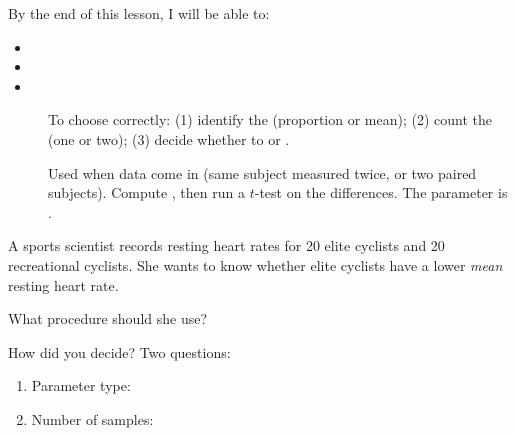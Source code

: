 \documentclass[10pt]{article}
\begin{document}
\namedateperiod

\vspace{0.12in}

\begin{objectivebox}
By the end of this lesson, I will be able to:
\begin{itemize}
  \item \writeline
  \item \writeline
  \item \writeline
\end{itemize}
\end{objectivebox}

\begin{vocabbox}
\begin{description}
  \item[]
        To choose correctly: (1) identify the \blank{4cm} (proportion or mean); (2) count
        the \blank{3.5cm} (one or two); (3) decide whether to \blank{3cm} or \blank{3cm}.
  \item[]
        Used when data come in \blank{4cm} (same subject measured twice, or two paired
        subjects). Compute \blank{3cm}, then run a \blank{5cm} $t$-test on the differences.
        The parameter is \blank{2cm}.
\end{description}
\end{vocabbox}

\begin{hookbox}
A sports scientist records resting heart rates for 20 elite cyclists and 20 recreational
cyclists. She wants to know whether elite cyclists have a lower \emph{mean} resting heart rate.

What procedure should she use? \blank{7cm}

How did you decide? Two questions:
\begin{enumerate}
  \item Parameter type: \blank{8cm}
  \item Number of samples: \blank{8cm}
\end{enumerate}
\end{hookbox}
\end{document}
